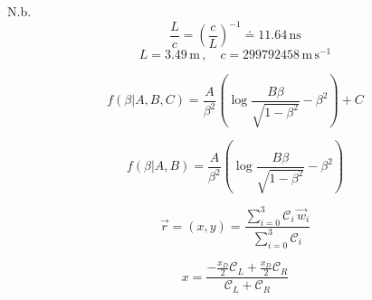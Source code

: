 \documentclass{article}
\begin{document}
N.b.
$$ \frac{L}{c} = \left( \frac{c}{L} \right)^{-1} \doteq 11.64\,\mathrm{ns}$$
$$ L = 3.49\, \mathrm{m}\,, \quad c = 299792458\, \mathrm{m}\,\mathrm{s}^{-1}$$

\clearpage


$$ f(\beta|A,B,C) = \frac{A}{\beta^2} \left( \log \frac{B\beta}{\sqrt{1-\beta^2}} - \beta^2 \right) + C $$

$$ f(\beta|A,B) = \frac{A}{\beta^2} \left( \log \frac{B\beta}{\sqrt{1-\beta^2}} - \beta^2 \right)$$

$$ \vec{r} = (x,y) = \frac{ \sum\limits_{i=0}^3  \mathcal{C}_i \, \vec{w}_i }{\sum\limits_{i=0}^3  \mathcal{C}_i}$$

$$ x = \frac{ -\frac{x_D}{2} \mathcal{C}_L + \frac{x_D}{2} \mathcal{C}_R }{\mathcal{C}_L + \mathcal{C}_R}$$
\end{document}
